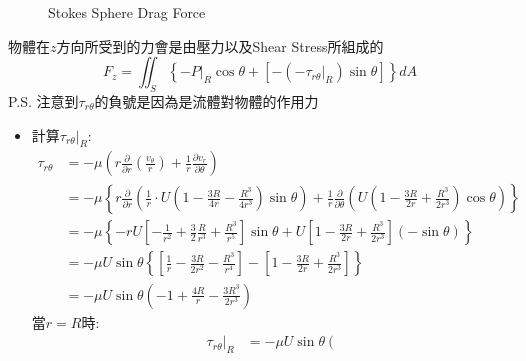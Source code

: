 \documentclass[../main.tex]{subfiles}
\begin{document}
\begin{itemize}
\begin{enumerate}
\begin{figure}[H]
    \caption{Stokes Sphere Drag Force}
    \label{fig:ch2_3_stokes_sphere_drag_force}
  \end{figure}
  物體在$z$方向所受到的力會是由壓力以及Shear Stress所組成的
  \begin{equation}
    F_z = \iint_{S}\left\{
      -P\big|_R \cos\theta + \left[-\left(-\tau_{r\theta}\big|_R\right)\sin\theta\right]  
    \right\} dA
  \end{equation}
  P.S. 注意到$\tau_{r\theta}$的負號是因為是流體對物體的作用力
  \begin{itemize}
    \item 計算$\tau_{r\theta}\big|_R$:
    \begin{align}
      \tau_{r\theta} &= -\mu \left(
        r\frac{\partial}{\partial r}\left(\frac{v_\theta}{r}\right) + \frac{1}{r}\frac{\partial v_r}{\partial \theta}
      \right) \nonumber\\
      &= -\mu \left\{
        r\frac{\partial}{\partial r}\left(
          \frac{1}{r} \cdot U \left(
            1 - \frac{3R}{4r} - \frac{R^3}{4r^3}
          \right) \sin\theta
        \right) + \frac{1}{r}\frac{\partial }{\partial \theta} \left(
          U \left(
            1 - \frac{3R}{2r} + \frac{R^3}{2r^3}
          \right) \cos\theta
        \right)
      \right\} \nonumber\\
      &= -\mu \left\{-r U\left[-\frac{1}{r^2}+\frac{3}{2}\frac{R}{r^3}+\frac{R^3}{r^5}\right]\sin\theta
      + U\left[
        1-\frac{3R}{2r}+\frac{R^3}{2r^3}
      \right](-\sin\theta)\right\} \nonumber \\
      &= -\mu U \sin\theta \left\{
        \left[\frac{1}{r}-\frac{3R}{2r^2}-\frac{R^3}{r^4}\right] - \left[
          1-\frac{3R}{2r}+\frac{R^3}{2r^3}
        \right]
      \right\} \nonumber\\
      &= -\mu U \sin\theta \left(
        -1 + \frac{4R}{r} - \frac{3R^3}{2r^3}
      \right) 
    \end{align}
    當$r=R$時:
    \begin{align}
      \tau_{r\theta}\big|_R &= -\mu U \sin\theta \left(

\end{align}
\end{itemize}
\end{enumerate}
\end{itemize}
\end{document}
